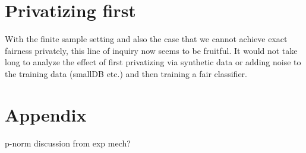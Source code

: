 \documentclass[format = sigconf]{acmart}
\newcommand{\1}{\mathbbm{1}}
\theoremstyle{definition}
\begin{document}
\section{Privatizing first}
With the finite sample setting and also the case that we cannot achieve exact fairness privately, this line of inquiry now seems to be fruitful. It would not take long to analyze the effect of first privatizing via synthetic data or adding noise to the training data (smallDB etc.) and then training a fair classifier.

\section{Appendix}
p-norm discussion from exp mech?
\end{document}
